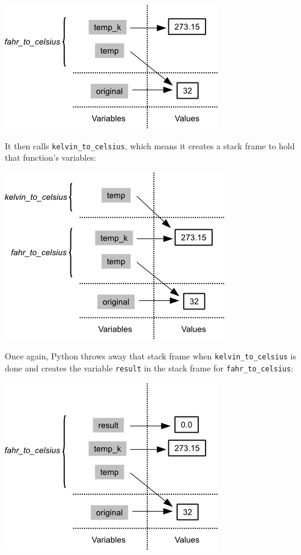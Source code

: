 \documentclass{book}
\begin{document}
\includegraphics{novice/python/img/python-call-stack-04.png}

It then calls \texttt{kelvin\_to\_celsius}, which means it creates a
stack frame to hold that function's variables:

\includegraphics{novice/python/img/python-call-stack-05.png}

Once again, Python throws away that stack frame when
\texttt{kelvin\_to\_celsius} is done and creates the variable
\texttt{result} in the stack frame for \texttt{fahr\_to\_celsius}:

\includegraphics{novice/python/img/python-call-stack-06.png}
\end{document}
